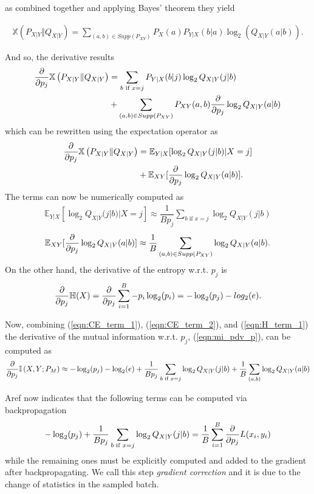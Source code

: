 as combined together and applying Bayes' theorem they yield

\begin{align}
\label{eqn:CE_expanded}
	\mathbb{X}\left(P_{X|Y} \Vert Q_{X|Y}\right) = \sum \limits_{(a,b) \in Supp(P_{XY})} P_X(a) P_{Y|X}(b|a) \log_2(Q_{X|Y}(a|b)). 
\end{align}

And so, the derivative results
\begin{align}
	\pdv{p_j} \mathbb{X}\left(P_{X|Y} \Vert Q_{X|Y}\right) &= \sum \limits_{b \text{ if } x=j} P_{Y|X}(b|j) \log_2 Q_{X|Y}(j|b) \\
	& + \sum \limits_{(a,b) \in Supp(P_{XY})} P_{XY}(a, b) \pdv{p_j} \log_2 Q_{X|Y}(a|b)
\end{align}
which can be rewritten using the expectation operator as
\begin{align}
	\pdv{p_j} \mathbb{X}\left(P_{X|Y} \Vert Q_{X|Y}\right) &= \mathbb{E}_{Y|X}[ \log_2 Q_{X|Y}(j|b)| X=j] \\
	& + \mathbb{E}_{XY}[ \pdv{p_j} \log_2 Q_{X|Y}(a|b)].
\end{align}
The terms can now be numerically computed as
\begin{align}
\label{eqn:CE_term_1}
	\mathbb{E}_{Y|X}[ \log_2 Q_{X|Y}(j|b)| X=j] \approx \dfrac{1}{Bp_j}\sum \limits_{b \text{ if } x=j} \log_2 Q_{X|Y}(j|b)
\end{align}
\begin{align}
\label{eqn:CE_term_2}
	\mathbb{E}_{XY}[ \pdv{p_j} \log_2 Q_{X|Y}(a|b)] \approx \dfrac{1}{B} \sum \limits_{(a,b) \in Supp(P_{XY})} \log_2 Q_{X|Y}(a|b).
\end{align}
On the other hand, the derivative of the entropy w.r.t. $p_j$ is
\begin{align}
\label{eqn:H_term_1}
	\pdv{p_j} \mathbb{H}(X) = \pdv{p_j} \sum \limits_{i = 1}^{B} - p_i \log_2(p_i) = - \log_2 (p_j) - log_2 (e).
\end{align}

Now, combining (\ref{eqn:CE_term_1}), (\ref{eqn:CE_term_2}), and (\ref{eqn:H_term_1}) the derivative of the mutual information w.r.t. $p_j$, (\ref{eqn:mi_pdv_p}), can be computed as
\begin{align}
	\pdv{p_j} \mathbb{I} \left(X , Y ; P_M \right) \approx - \log_2 (p_j) - \log_2 (e) + \dfrac{1}{Bp_j}\sum \limits_{b \text{ if } x=j} \log_2 Q_{X|Y}(j|b) + \dfrac{1}{B} \sum \limits_{(a,b)} \log_2 Q_{X|Y}(a|b)
\end{align}

Aref now indicates that the following terms can be computed via backpropagation
\begin{align}
	- \log_2 (p_j) + \dfrac{1}{Bp_j}\sum \limits_{b \text{ if } x=j} \log_2 Q_{X|Y}(j|b) = \dfrac{1}{B} \sum \limits_{i = 1}^{B} \pdv{p_j} L(x_i, y_i)
\end{align}
while the remaining ones must be explicitly computed and added to the gradient after backpropagating. We call this step \textit{gradient correction} and it is due to the change of statistics in the sampled batch.


